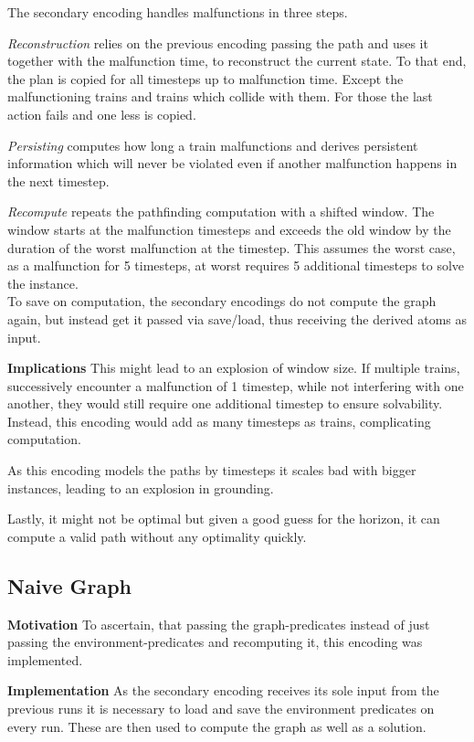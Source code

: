\noindent The secondary encoding handles malfunctions in three steps.

\textit{Reconstruction} relies on the previous encoding passing the path and uses it together with the malfunction time, to reconstruct the current state. To that end, the plan is copied for all timesteps up to malfunction time. Except the malfunctioning trains and trains which collide with them. For those the last action fails and one less is copied. 

\textit{Persisting} computes how long a train malfunctions and derives persistent information which will never be violated even if another malfunction happens in the next timestep.

\textit{Recompute} repeats the pathfinding computation with a shifted window. The window starts at the malfunction timesteps and exceeds the old window by the duration of the worst malfunction at the timestep. This assumes the worst case, as a malfunction for 5 timesteps, at worst requires 5 additional timesteps to solve the instance.\\

To save on computation, the secondary encodings do not compute the graph again, but instead get it passed via save/load, thus receiving the derived atoms as input.

\noindent \textbf{Implications} This might lead to an explosion of window size. If multiple trains, successively encounter a malfunction of 1 timestep, while not interfering with one another, they would still require one additional timestep to ensure solvability. Instead, this encoding would add as many timesteps as trains, complicating computation.

As this encoding models the paths by timesteps it scales bad with bigger instances, leading to an explosion in grounding.

Lastly, it might not be optimal but given a good guess for the horizon, it can compute a valid path without any optimality quickly.

\subsection{Naive Graph}
\textbf{Motivation} To ascertain, that passing the graph-predicates instead of just passing the environment-predicates and recomputing it, this encoding was implemented.

\textbf{Implementation} As the secondary encoding receives its sole input from the previous runs it is necessary to load and save the environment predicates on every run. These are then used to compute the graph as well as a solution.


